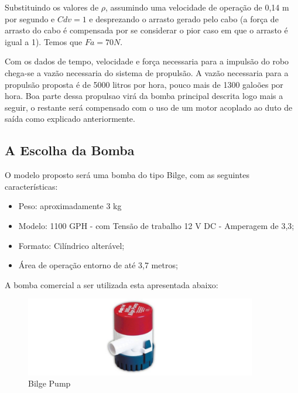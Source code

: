 Substituindo os valores de $\rho$, assumindo uma velocidade de operação de 0,14 m por segundo e $Cdv = 1$ e desprezando o arrasto gerado pelo cabo (a força de arrasto do cabo é compensada por se considerar o pior caso em que o arrasto é igual a 1). Temos que $Fa = 70N$.

Com os dados de tempo, velocidade e força necessaria para a impulsão do robo chega-se a vazão necessaria do sistema de propulsão. A vazão necessaria para a propulsão proposta é de 5000 litros por hora, pouco mais de 1300 galoões por hora. Boa parte dessa propulsao virá da bomba principal descrita logo mais a seguir, o restante será compensado com o uso de um motor acoplado ao duto de saída como explicado anteriormente.

\subsection{A Escolha da Bomba}
O modelo proposto será uma bomba do tipo \textsf{Bilge}, com as seguintes características:
\begin{itemize}
\item Peso: aproximadamente 3 kg
\item Modelo: 1100 GPH - com Tensão de trabalho 12 V DC - Amperagem de 3,3;
\item Formato: Cilíndrico alterável;
\item Área de operação entorno de até 3,7 metros;
\end{itemize}

A bomba comercial a ser utilizada esta apresentada abaixo:
\par
\begin{figure}[h]
  \centering
  \includegraphics[width=0.9\textwidth]{figures/waterbomb.png}
  \caption{Bilge Pump}
  \label{fig:waterbomb}
\end{figure}
\FloatBarrier
\par
